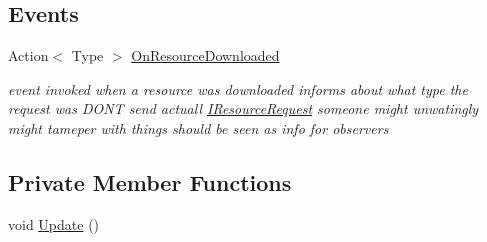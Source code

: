 \subsection*{Events}
\begin{DoxyCompactItemize}
\item 
Action$<$ Type $>$ \mbox{\hyperlink{class_resource_loader_a81acd4bfcfed997a7a339d90383a2a26}{On\+Resource\+Downloaded}}
\begin{DoxyCompactList}\small\item\em event invoked when a resource was downloaded informs about what type the request was D\+O\+NT send actuall \mbox{\hyperlink{interface_i_resource_request}{I\+Resource\+Request}} someone might unwatingly might tameper with things should be seen as info for observers \end{DoxyCompactList}\end{DoxyCompactItemize}
\subsection*{Private Member Functions}
\begin{DoxyCompactItemize}
\item 
void \mbox{\hyperlink{class_resource_loader_a20a1036648a453863c96b51d33edfa11}{Update}} ()
\end{DoxyCompactItemize}
